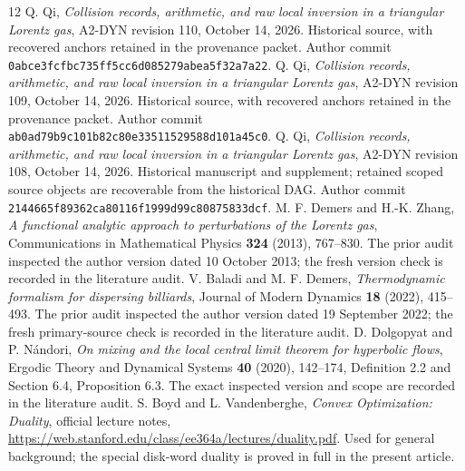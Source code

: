 \documentclass[11pt,reqno]{amsart}
\numberwithin{equation}{section}
\theoremstyle{definition}\newtheorem{definition}[theorem]{Definition}
\theoremstyle{remark}\newtheorem{remark}[theorem]{Remark}
\begin{document}
\begin{thebibliography}{12}
 Q. Qi,
\emph{Collision records, arithmetic, and raw local inversion in a
triangular Lorentz gas}, A2-DYN revision 110, October 14, 2026.
Historical source, with recovered anchors retained in the provenance packet.
Author commit \texttt{0abce3fcfbc735ff5cc6d085279abea5f32a7a22}.
 Q. Qi,
\emph{Collision records, arithmetic, and raw local inversion in a
triangular Lorentz gas}, A2-DYN revision 109, October 14, 2026.
Historical source, with recovered anchors retained in the provenance packet.
Author commit \texttt{ab0ad79b9c101b82c80e33511529588d101a45c0}.
 Q. Qi,
\emph{Collision records, arithmetic, and raw local inversion in a
triangular Lorentz gas}, A2-DYN revision 108, October 14, 2026.
Historical manuscript and supplement; retained scoped source objects are recoverable from the historical DAG. Author commit
\texttt{2144665f89362ca80116f1999d99c80875833dcf}.
 M. F. Demers and H.-K. Zhang,
\emph{A functional analytic approach to perturbations of the Lorentz gas},
Communications in Mathematical Physics \textbf{324} (2013), 767--830.
The prior audit inspected the author version dated 10 October 2013; the fresh version check is recorded in the literature audit.
 V. Baladi and M. F. Demers,
\emph{Thermodynamic formalism for dispersing billiards},
Journal of Modern Dynamics \textbf{18} (2022), 415--493.
The prior audit inspected the author version dated 19 September 2022; the fresh primary-source check is recorded in the literature audit.
 D. Dolgopyat and P. N\'andori,
\emph{On mixing and the local central limit theorem for hyperbolic flows},
Ergodic Theory and Dynamical Systems \textbf{40} (2020), 142--174,
Definition 2.2 and Section 6.4, Proposition 6.3. The exact inspected
version and scope are recorded in the literature audit.
 S. Boyd and L. Vandenberghe,
\emph{Convex Optimization: Duality}, official lecture notes,
\url{https://web.stanford.edu/class/ee364a/lectures/duality.pdf}.
Used for general background; the special disk-word duality is proved
in full in the present article.
\end{thebibliography}
\end{document}
